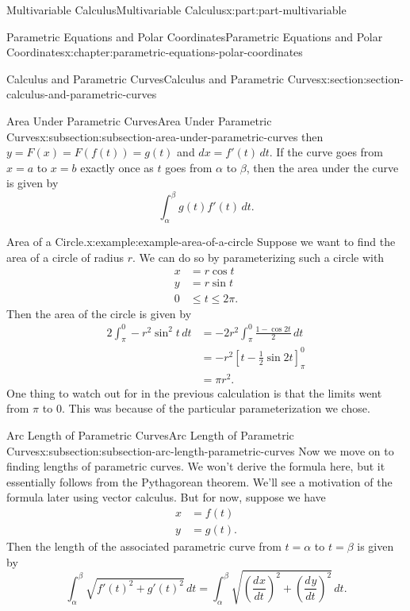 \documentclass[twoside,10pt,]{tufte-book}
\numberwithin{equation}{part}
\newcommand{\dv}[3][]{\dfrac{d^{#1} #2}{d #3^{#1}}}
\newcommand{\amp}{&}
\begin{document}
\begin{partptx}{Multivariable Calculus}{}{Multivariable Calculus}{}{}{x:part:part-multivariable}
\begin{chapterptx}{Parametric Equations and Polar Coordinates}{}{Parametric Equations and Polar Coordinates}{}{}{x:chapter:parametric-equations-polar-coordinates}
\begin{sectionptx}{Calculus and Parametric Curves}{}{Calculus and Parametric Curves}{}{}{x:section:section-calculus-and-parametric-curves}
\begin{subsectionptx}{Area Under Parametric Curves}{}{Area Under Parametric Curves}{}{}{x:subsection:subsection-area-under-parametric-curves}
then \(y = F(x) = F(f(t)) = g(t)\) and \(dx = f'(t)\,dt\). If the curve goes from \(x=a\) to \(x=b\) exactly once as \(t\) goes from \(\alpha\) to \(\beta\), then the area under the curve is given by%
\begin{equation*}
\int_{\alpha}^{\beta}g(t)f'(t)\,dt.
\end{equation*}
%
\begin{example}{Area of a Circle.}{x:example:example-area-of-a-circle}%
Suppose we want to find the area of a circle of radius \(r\). We can do so by parameterizing such a circle with%
%
\begin{align*}
x \amp = r\cos t \\
y \amp = r\sin t \\
0 \amp \leq t\leq 2\pi. 
\end{align*}
Then the area of the circle is given by%
\begin{align*}
2\int_{\pi}^{0} -r^{2}\sin^{2}t\,dt \amp= -2r^{2}\int_{\pi}^{0}\frac{1-\cos2t}{2}\,dt\\
\amp = -r^{2}\left[t-\frac{1}{2}\sin2t\right]_{\pi}^{0} \\
\amp = \pi r^{2}.
\end{align*}
One thing to watch out for in the previous calculation is that the limits went from \(\pi\) to \(0\). This was because of the particular parameterization we chose.%
\end{example}
\end{subsectionptx}
%
%
\typeout{************************************************}
\typeout{************************************************}
%
\begin{subsectionptx}{Arc Length of Parametric Curves}{}{Arc Length of Parametric Curves}{}{}{x:subsection:subsection-arc-length-parametric-curves}
Now we move on to finding lengths of parametric curves. We won't derive the formula here, but it essentially follows from the Pythagorean theorem. We'll see a motivation of the formula later using vector calculus. But for now, suppose we have%
%
\begin{align*}
x \amp = f(t) \\
y \amp = g(t). 
\end{align*}
Then the length of the associated parametric curve from \(t=\alpha\) to \(t=\beta\) is given by%
%
\begin{equation*}
\int_{\alpha}^{\beta} \sqrt{f'(t)^{2}+g'(t)^{2}}\,dt = \int_{\alpha}^{\beta}\sqrt{\left(\dv{x}{t}\right)^{2} + \left(\dv{y}{t}\right)^{2}}\,dt.

\end{equation*}
\end{subsectionptx}
\end{sectionptx}
\end{chapterptx}
\end{partptx}
\end{document}
